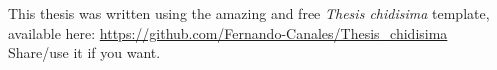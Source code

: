 \pagebreak

\vspace*{\fill}

\noindent This thesis was written using the amazing and free 
\textit{Thesis chidisima} template, available here: \url{https://github.com/Fernando-Canales/Thesis_chidisima} Share/use it if you want. 

\pagebreak
